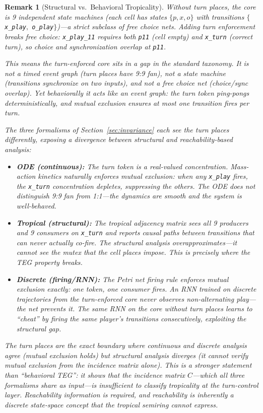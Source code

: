 \documentclass[11pt,a4paper]{article}
\newtheorem{remark}[theorem]{Remark}
\begin{document}
\begin{remark}[Structural vs.\ Behavioral Tropicality]
Without turn places, the core is 9 independent state machines (each cell has states $\{p, x, o\}$ with transitions $\{$\texttt{x\_play}$,$ \texttt{o\_play}$\}$)---a strict subclass of free choice nets.
Adding turn enforcement breaks free choice: \texttt{x\_play\_11} requires both \texttt{p11} (cell empty) and \texttt{x\_turn} (correct turn), so choice and synchronization overlap at \texttt{p11}.

This means the turn-enforced core sits in a gap in the standard taxonomy.
It is not a timed event graph (turn places have 9:9 fan), not a state machine (transitions synchronize on two inputs), and not a free choice net (choice/sync overlap).
Yet behaviorally it acts like an event graph: the turn token ping-pongs deterministically, and mutual exclusion ensures at most one transition fires per turn.

The three formalisms of Section~\ref{sec:invariance} each see the turn places differently, exposing a divergence between structural and reachability-based analysis:

\begin{itemize}
  \item \textbf{ODE (continuous):} The turn token is a real-valued concentration.
  Mass-action kinetics naturally enforces mutual exclusion: when any \texttt{x\_play} fires, the \texttt{x\_turn} concentration depletes, suppressing the others.
  The ODE does not distinguish 9:9 fan from 1:1---the dynamics are smooth and the system is well-behaved.

  \item \textbf{Tropical (structural):} The tropical adjacency matrix sees all 9 producers and 9 consumers on \texttt{x\_turn} and reports causal paths between transitions that can never actually co-fire.
  The structural analysis \emph{overapproximates}---it cannot see the mutex that the cell places impose.
  This is precisely where the TEG property breaks.

  \item \textbf{Discrete (firing/RNN):} The Petri net firing rule enforces mutual exclusion exactly: one token, one consumer fires.
  An RNN trained on discrete trajectories from the turn-enforced core never observes non-alternating play---the net prevents it.
  The same RNN on the core \emph{without} turn places learns to ``cheat'' by firing the same player's transitions consecutively, exploiting the structural gap.
\end{itemize}

The turn places are the exact boundary where continuous and discrete analysis agree (mutual exclusion holds) but structural analysis diverges (it cannot verify mutual exclusion from the incidence matrix alone).
This is a stronger statement than ``behavioral TEG'': it shows that the incidence matrix $C$---which all three formalisms share as input---is \emph{insufficient} to classify tropicality at the turn-control layer.
Reachability information is required, and reachability is inherently a discrete state-space concept that the tropical semiring cannot express.


\end{remark}
\end{document}
